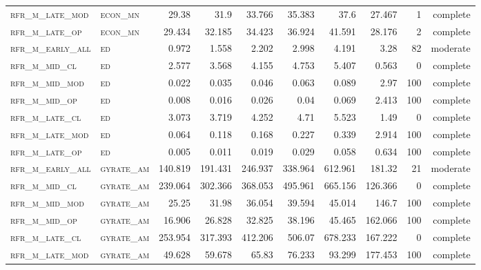 \begin{landscape}
\begin{center}
\begin{footnotesize}
\begin{longtable}{llrrrrr|rrr}
\textsc{rfr\_m\_late\_mod } & \textsc{econ\_mn  }   & 29.38   & 31.9    & 33.766  & 35.383   & 37.6     & 27.467  & 1   & complete \\
\textsc{rfr\_m\_late\_op  } & \textsc{econ\_mn  }   & 29.434  & 32.185  & 34.423  & 36.924   & 41.591   & 28.176  & 2   & complete \\
\textsc{rfr\_m\_early\_all} & \textsc{ed        }   & 0.972   & 1.558   & 2.202   & 2.998    & 4.191    & 3.28    & 82  & moderate \\
\textsc{rfr\_m\_mid\_cl   } & \textsc{ed        }   & 2.577   & 3.568   & 4.155   & 4.753    & 5.407    & 0.563   & 0   & complete \\
\textsc{rfr\_m\_mid\_mod  } & \textsc{ed        }   & 0.022   & 0.035   & 0.046   & 0.063    & 0.089    & 2.97    & 100 & complete \\
\textsc{rfr\_m\_mid\_op   } & \textsc{ed        }   & 0.008   & 0.016   & 0.026   & 0.04     & 0.069    & 2.413   & 100 & complete \\
\textsc{rfr\_m\_late\_cl  } & \textsc{ed        }   & 3.073   & 3.719   & 4.252   & 4.71     & 5.523    & 1.49    & 0   & complete \\
\textsc{rfr\_m\_late\_mod } & \textsc{ed        }   & 0.064   & 0.118   & 0.168   & 0.227    & 0.339    & 2.914   & 100 & complete \\
\textsc{rfr\_m\_late\_op  } & \textsc{ed        }   & 0.005   & 0.011   & 0.019   & 0.029    & 0.058    & 0.634   & 100 & complete \\
\textsc{rfr\_m\_early\_all} & \textsc{gyrate\_am}   & 140.819 & 191.431 & 246.937 & 338.964  & 612.961  & 181.32  & 21  & moderate \\
\textsc{rfr\_m\_mid\_cl   } & \textsc{gyrate\_am}   & 239.064 & 302.366 & 368.053 & 495.961  & 665.156  & 126.366 & 0   & complete \\
\textsc{rfr\_m\_mid\_mod  } & \textsc{gyrate\_am}   & 25.25   & 31.98   & 36.054  & 39.594   & 45.014   & 146.7   & 100 & complete \\
\textsc{rfr\_m\_mid\_op   } & \textsc{gyrate\_am}   & 16.906  & 26.828  & 32.825  & 38.196   & 45.465   & 162.066 & 100 & complete \\
\textsc{rfr\_m\_late\_cl  } & \textsc{gyrate\_am}   & 253.954 & 317.393 & 412.206 & 506.07   & 678.233  & 167.222 & 0   & complete \\
\textsc{rfr\_m\_late\_mod } & \textsc{gyrate\_am}   & 49.628  & 59.678  & 65.83   & 76.233   & 93.299   & 177.453 & 100 & complete \\

\end{longtable}
\end{footnotesize}
\end{center}
\end{landscape}

